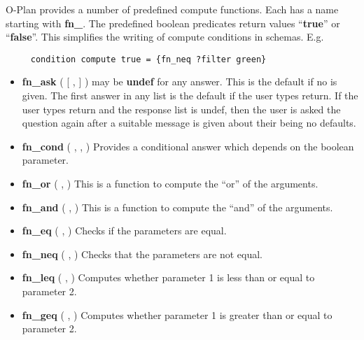 \label{predefined-compute-functions}
O-Plan provides a number of predefined compute functions.  Each
has a name starting with {\bf fn\_}.  The predefined
boolean predicates return values ``{\bf true}'' or ``{\bf false}''.  This
simplifies the writing of compute conditions in schemas.  E.g.

\begin{verbatim}
     condition compute true = {fn_neq ?filter green}
\end{verbatim}

\begin{itemize}

\item {\bf fn\_ask} (  [ ,  ] ) \newline
{} may be {\bf undef} for any answer.
This is the default if no  is given.  The first answer in
any list is the default if the user types return.  If the user types return
and the response list is undef, then the user is asked the question again
after a suitable message is given about their being no defaults.

\item {\bf fn\_cond} (  ,  ,
 ) \newline
Provides a conditional answer which depends on the boolean parameter.

\item {\bf fn\_or} (  ,  ) \newline
This is a function to compute the ``or'' of the arguments.

\item {\bf fn\_and} (  ,  ) \newline
This is a function to compute the ``and'' of the arguments.

\item {\bf fn\_eq} (  ,  ) \newline
Checks if the parameters are equal.

\item {\bf fn\_neq} (  ,  ) \newline
Checks that the parameters are not equal.

\item {\bf fn\_leq} (  ,  ) \newline
Computes whether parameter 1 is less than or equal to parameter 2.

\item {\bf fn\_geq} (  ,  ) \newline
Computes whether parameter 1 is greater than or equal to parameter 2.

\end{itemize}

